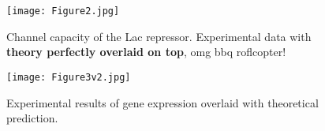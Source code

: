 
\begin{figure}[h!]
	\centering \texttt{[image: Figure2.jpg]} \caption{Channel capacity of the Lac repressor. Experimental data with \textbf{theory perfectly overlaid on top}, omg bbq roflcopter!}
	\label{figChannelCapacity}
\end{figure}

\begin{figure}[h!]
	\centering \texttt{[image: Figure3v2.jpg]} \caption{Experimental results of gene expression overlaid with theoretical prediction. }
	\label{figFullProfile}
\end{figure}